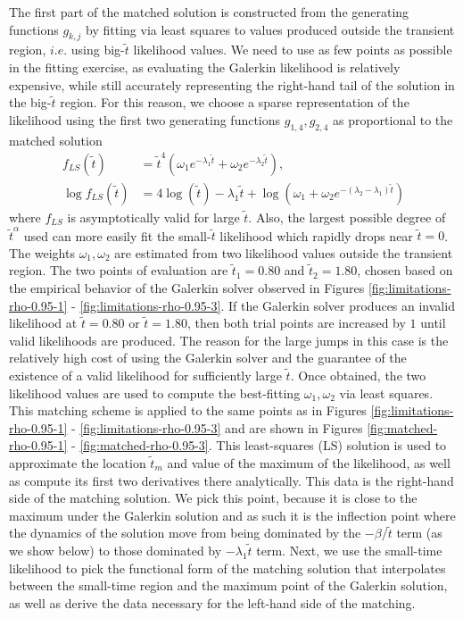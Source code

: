 The first part of the matched solution is constructed from the
generating functions $g_{k,j}$ by fitting via least squares to values
produced outside the transient region, $i.e.$ using big-$\tilde{t}$
likelihood values. We need to use as few points as possible in the
fitting exercise, as evaluating the Galerkin likelihood is relatively
expensive, while still accurately representing the right-hand tail of
the solution in the big-$\tilde{t}$ region. For this reason, we choose
a sparse representation of the likelihood using the first two
generating functions $g_{1,4}, g_{2,4}$ as proportional to the matched
solution
\begin{align*}
  f_{LS}(\tilde{t}) &= \tilde{t}^4 \left( \omega_1 e^{-\lambda_1\tilde{t}} + \omega_2 e^{-\lambda_2\tilde{t}}\right), \\
  \log f_{LS}(\tilde{t})&= 4\log(\tilde{t}) - \lambda_1\tilde{t} + \log\left(\omega_1 + \omega_2e^{-(\lambda_2-\lambda_1)\tilde{t}} \right)
\end{align*}
where $f_{LS}$ is asymptotically valid for large $\tilde{t}$. Also,
the largest possible degree of $\tilde{t}^{\alpha}$ used can more
easily fit the small-$\tilde{t}$ likelihood which rapidly drops near
$\tilde{t} = 0$. The weights $\omega_{1}, \omega_{2}$ are estimated
from two likelihood values outside the transient region. The two
points of evaluation are $\tilde{t}_1 = 0.80$ and
$\tilde{t}_2 = 1.80$, chosen based on the empirical behavior of the
Galerkin solver observed in Figures \ref{fig:limitations-rho-0.95-1} -
\ref{fig:limitations-rho-0.95-3}. If the Galerkin solver produces an
invalid likelihood at $\tilde{t} = 0.80$ or $\tilde{t} = 1.80$, then
both trial points are increased by $1$ until valid likelihoods are
produced. The reason for the large jumps in this case is the
relatively high cost of using the Galerkin solver and the guarantee of
the existence of a valid likelihood for sufficiently large
$\tilde{t}$. Once obtained, the two likelihood values are used to
compute the best-fitting $\omega_{1}, \omega_{2}$ via least
squares. This matching scheme is applied to the same points as in
Figures \ref{fig:limitations-rho-0.95-1} -
\ref{fig:limitations-rho-0.95-3} and are shown in Figures
\ref{fig:matched-rho-0.95-1} - \ref{fig:matched-rho-0.95-3}. This
least-squares (LS) solution is used to approximate the location
$\tilde{t}_m$ and value of the maximum of the likelihood, as well as
compute its first two derivatives there analytically. This data is the
right-hand side of the matching solution. We pick this point, because
it is close to the maximum under the Galerkin solution and as such it
is the inflection point where the dynamics of the solution move from
being dominated by the $-\beta/\tilde{t}$ term (as we show below) to
those dominated by $-\lambda_1\tilde{t}$ term. Next, we use the
small-time likelihood to pick the functional form of the matching
solution that interpolates between the small-time region and the
maximum point of the Galerkin solution, as well as derive the data
necessary for the left-hand side of the matching.


